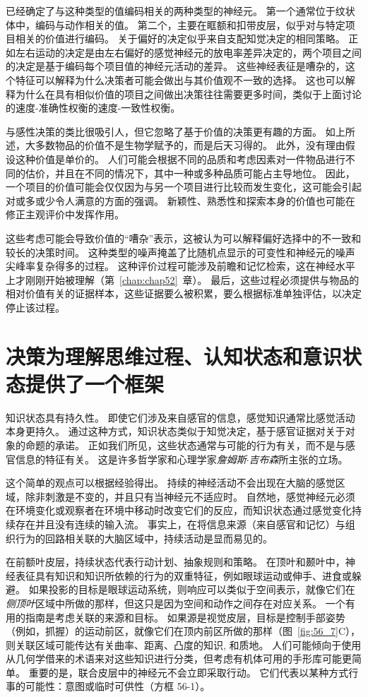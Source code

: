 已经确定了与这种类型的值编码相关的两种类型的神经元。
第一个通常位于纹状体中，编码与动作相关的值。
第二个，主要在眶额和扣带皮层，似乎对与特定项目相关的价值进行编码。
关于偏好的决定似乎来自支配知觉决定的相同策略。
正如左右运动的决定是由左右偏好的感觉神经元的放电率差异决定的，两个项目之间的决定是基于编码每个项目值的神经元活动的差异。
这些神经表征是嘈杂的，这个特征可以解释为什么决策者可能会做出与其价值观不一致的选择。
这也可以解释为什么在具有相似价值的项目之间做出决策往往需要更多时间，类似于上面讨论的速度-准确性权衡的速度-一致性权衡。


与感性决策的类比很吸引人，但它忽略了基于价值的决策更有趣的方面。
如上所述，大多数物品的价值不是生物学赋予的，而是后天习得的。
此外，没有理由假设这种价值是单价的。
人们可能会根据不同的品质和考虑因素对一件物品进行不同的估价，并且在不同的情况下，其中一种或多种品质可能占主导地位。
因此，一个项目的价值可能会仅仅因为与另一个项目进行比较而发生变化，这可能会引起对或多或少令人满意的方面的强调。
新颖性、熟悉性和探索本身的价值也可能在修正主观评价中发挥作用。


这些考虑可能会导致价值的“嘈杂”表示，这被认为可以解释偏好选择中的不一致和较长的决策时间。
这种类型的噪声掩盖了比随机点显示的可变性和神经元的噪声尖峰率复杂得多的过程。
这种评价过程可能涉及前瞻和记忆检索，这在神经水平上才刚刚开始被理解（第~\ref{chap:chap52}~章）。
最后，这些过程必须提供与物品的相对价值有关的证据样本，这些证据要么被积累，要么根据标准单独评估，以决定停止该过程。



\section{决策为理解思维过程、认知状态和意识状态提供了一个框架}

知识状态具有持久性。 即使它们涉及来自感官的信息，感觉知识通常比感觉活动本身更持久。
通过这种方式，知识状态类似于知觉决定，基于感官证据对关于对象的命题的承诺。
正如我们所见，这些状态通常与可能的行为有关，而不是与感官信息的特征有关。
这是许多哲学家和心理学家\textit{詹姆斯$\cdot$吉布森}所主张的立场。


这个简单的观点可以根据经验得出。
持续的神经活动不会出现在大脑的感觉区域，除非刺激是不变的，并且只有当神经元不适应时。
自然地，感觉神经元必须在环境变化或观察者在环境中移动时改变它们的反应，而知识状态通过感觉变化持续存在并且没有连续的输入流。
事实上，在将信息来源（来自感官和记忆）与组织行为的回路相关联的大脑区域中，持续活动是显而易见的。


在前额叶皮层，持续状态代表行动计划、抽象规则和策略。
在顶叶和颞叶中，神经表征具有知识和知识所依赖的行为的双重特征，例如眼球运动或伸手、进食或躲避。
如果投影的目标是眼球运动系统，则响应可以类似于空间表示，就像它们在\textit{侧顶叶}区域中所做的那样，但这只是因为空间和动作之间存在对应关系。
一个有用的指南是考虑关联的来源和目标。
如果源是视觉皮层，目标是控制手部姿势（例如，抓握）的运动前区，就像它们在顶内前区所做的那样（图~\ref{fig:56_7}C），则关联区域可能传达有关曲率、距离、凸度的知识, 和质地。
人们可能倾向于使用从几何学借来的术语来对这些知识进行分类，但考虑有机体可用的手形库可能更简单。
重要的是，联合皮层中的神经元不会立即采取行动。
它们代表以某种方式行事的可能性：意图或临时可供性（方框 56-1）。


